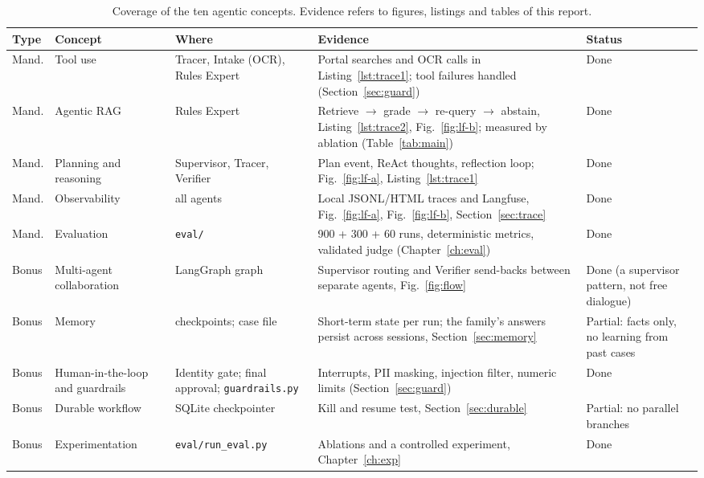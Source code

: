 \begin{table}[H]
\centering\footnotesize{}
\caption[Coverage of the ten agentic concepts]{Coverage of the ten agentic concepts. Evidence refers to figures, listings and tables of this report.}\label{tab:matrix}
\renewcommand{\arraystretch}{1.1}
\begin{tabularx}{\linewidth}{@{}p{0.9cm}p{2.0cm}p{2.4cm}Xp{2.2cm}@{}}
\toprule
\textbf{Type} & \textbf{Concept} & \textbf{Where} & \textbf{Evidence} & \textbf{Status} \\ \midrule
Mand. & Tool use & Tracer, Intake (OCR), Rules Expert & Portal searches and OCR calls in Listing~\ref{lst:trace1}; tool failures handled (Section~\ref{sec:guard}) & Done \\
Mand. & Agentic RAG & Rules Expert & Retrieve $\to$ grade $\to$ re-query $\to$ abstain, Listing~\ref{lst:trace2}, Fig.~\ref{fig:lf-b}; measured by ablation (Table~\ref{tab:main}) & Done \\
Mand. & Planning and reasoning & Supervisor, Tracer, Verifier & Plan event, ReAct thoughts, reflection loop; Fig.~\ref{fig:lf-a}, Listing~\ref{lst:trace1} & Done \\
Mand. & Observability & all agents & Local JSONL/HTML traces and Langfuse, Fig.~\ref{fig:lf-a}, Fig.~\ref{fig:lf-b}, Section~\ref{sec:trace} & Done \\
Mand. & Evaluation & \texttt{eval/} & 900 + 300 + 60 runs, deterministic metrics, validated judge (Chapter~\ref{ch:eval}) & Done \\
Bonus & Multi-agent collaboration & LangGraph graph & Supervisor routing and Verifier send-backs between separate agents, Fig.~\ref{fig:flow} & Done (a supervisor pattern, not free dialogue) \\
Bonus & Memory & checkpoints; case file & Short-term state per run; the family's answers persist across sessions, Section~\ref{sec:memory} & Partial: facts only, no learning from past cases \\
Bonus & Human-in-the-loop and guardrails & Identity gate; final approval; \texttt{guardrails.py} & Interrupts, PII masking, injection filter, numeric limits (Section~\ref{sec:guard}) & Done \\
Bonus & Durable workflow & SQLite checkpointer & Kill and resume test, Section~\ref{sec:durable} & Partial: no parallel branches \\
Bonus & Experimentation & \texttt{eval/run\_eval.py} & Ablations and a controlled experiment, Chapter~\ref{ch:exp} & Done \\ \bottomrule
\end{tabularx}
\end{table}

